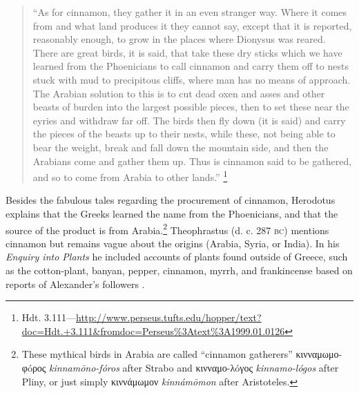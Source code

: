 \begin{quote}
    ``As for cinnamon, they gather it in an even stranger way. Where it comes from and what land produces it they cannot say, except that it is reported, reasonably enough, to grow in the places where Dionysus was reared. There are great birds, it is said, that take these dry sticks which we have learned from the Phoenicians to call cinnamon and carry them off to nests stuck with mud to precipitous cliffs, where man has no means of approach. The Arabian solution to this is to cut dead oxen and asses and other beasts of burden into the largest possible pieces, then to set these near the eyries and withdraw far off. The birds then fly down (it is said) and carry the pieces of the beasts up to their nests, while these, not being able to bear the weight, break and fall down the mountain side, and then the Arabians come and gather them up. Thus is cinnamon said to be gathered, and so to come from Arabia to other lands.'' \autocite[139]{herodotus_herodotus_1921}\footnote{Hdt. 3.111---\url{http://www.perseus.tufts.edu/hopper/text?doc=Hdt.+3.111&fromdoc=Perseus\%3Atext\%3A1999.01.0126}}
\end{quote}

Besides the fabulous tales regarding the procurement of cinnamon, Herodotus explains that the Greeks learned the name from the Phoenicians, and that the source of the product is from Arabia.\footnote{These mythical birds in Arabia are  called ``cinnamon gatherers'' κινναμωμο-φóρος \textit{kinnamōno-fóros} after Strabo and κινναμο-λóγος \textit{kinnamo-lógos} after Pliny, or just simply κιννάμωμον \textit{kinnámōmon} after Aristoteles.} Theophrastus (d. c. 287 \textsc{bc}) mentions cinnamon but remains vague about the origins (Arabia, Syria, or India). In his \textit{Enquiry into Plants} he included accounts of plants found outside of Greece, such as the cotton-plant, banyan, pepper, cinnamon, myrrh, and frankincense based on reports of Alexander’s followers \autocite[xix,323]{theophrastus_enquiry_1916}.





